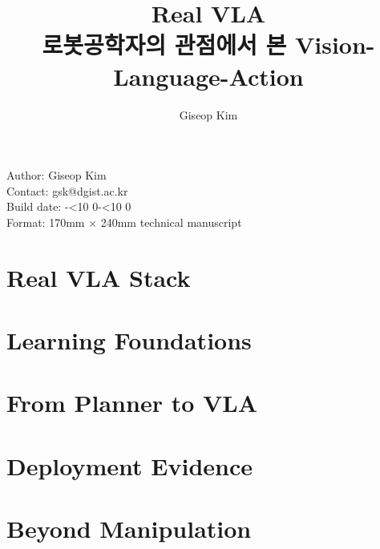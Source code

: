 \documentclass[11pt,oneside,openany]{oblivoir}
\title{\sffamily\bfseries Real VLA\\{\Large 로봇공학자의 관점에서 본 Vision-Language-Action}}
\author{Giseop Kim}
\date{}
\numberwithin{section}{chapter}
\numberwithin{subsection}{section}
\numberwithin{equation}{chapter}
\newcounter{rvlatocpart}
\newcounter{rvlatocchapter}
\newcommand{\twodigits}[1]{\ifnum#1<10 0\fi\number#1}
\newcommand{\builddate}{\number\year-\twodigits{\month}-\twodigits{\day}}
\begin{document}
\frontmatter
\maketitle
\clearpage
\thispagestyle{empty}
\vspace*{\fill}
{\sffamily\small
\noindent Author: Giseop Kim\\
\noindent Contact: gsk@dgist.ac.kr\\
\noindent Build date: \builddate\\
\noindent Format: 170mm $\times$ 240mm technical manuscript
}
\clearpage

\clearpage
\makeatletter
\begingroup
\hypersetup{linkcolor=rvlaBlue}
\pagestyle{rvlatoc}
\setcounter{rvlatocpart}{0}
\setcounter{rvlatocchapter}{-1}
{\let\addcontentsline\@gobblethree\tableofcontents}
\clearpage
\endgroup
\pagestyle{fancy}
\makeatother

\mainmatter
\setcounter{chapter}{-1}

\clearpage
\part{Real VLA Stack}

\clearpage

\clearpage

\clearpage

\clearpage

\clearpage

\clearpage
\part{Learning Foundations}

\clearpage

\clearpage

\clearpage

\clearpage
\part{From Planner to VLA}

\clearpage

\clearpage

\clearpage

\clearpage

\clearpage

\clearpage
\part{Deployment Evidence}

\clearpage

\clearpage

\clearpage

\clearpage
\part{Beyond Manipulation}

\clearpage

\clearpage

\clearpage
\end{document}
